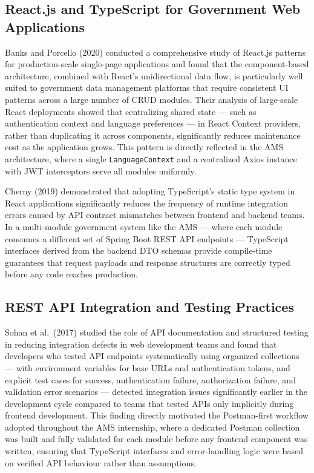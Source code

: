 \documentclass[12pt,a4paper]{report}
\begin{document}
\subsection{React.js and TypeScript for Government Web Applications}

Banks and Porcello (2020) conducted a comprehensive study of React.js patterns for
production-scale single-page applications and found that the component-based
architecture, combined with React's unidirectional data flow, is particularly well suited
to government data management platforms that require consistent UI patterns across a
large number of CRUD modules. Their analysis of large-scale React deployments showed
that centralizing shared state — such as authentication context and language preferences
— in React Context providers, rather than duplicating it across components, significantly
reduces maintenance cost as the application grows. This pattern is directly reflected in
the AMS architecture, where a single \texttt{LanguageContext} and a centralized Axios
instance with JWT interceptors serve all modules uniformly.

Cherny (2019) demonstrated that adopting TypeScript's static type system in React
applications significantly reduces the frequency of runtime integration errors caused by
API contract mismatches between frontend and backend teams. In a multi-module
government system like the AMS — where each module consumes a different set of
Spring Boot REST API endpoints — TypeScript interfaces derived from the backend DTO
schemas provide compile-time guarantees that request payloads and response structures
are correctly typed before any code reaches production.

\subsection{REST API Integration and Testing Practices}

Sohan et al.\ (2017) studied the role of API documentation and structured testing in
reducing integration defects in web development teams and found that developers who
tested API endpoints systematically using organized collections — with environment
variables for base URLs and authentication tokens, and explicit test cases for success,
authentication failure, authorization failure, and validation error scenarios — detected
integration issues significantly earlier in the development cycle compared to teams that
tested APIs only implicitly during frontend development. This finding directly motivated
the Postman-first workflow adopted throughout the AMS internship, where a dedicated
Postman collection was built and fully validated for each module before any frontend
component was written, ensuring that TypeScript interfaces and error-handling logic
were based on verified API behaviour rather than assumptions.
\end{document}
